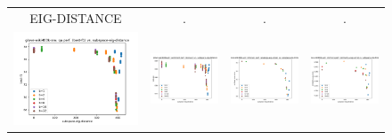 \begin{figure}
\begin{tabular}{@{\hskip -0.0in}c@{\hskip -0.0in}c@{\hskip -0.0in}c@{\hskip -0.0in}c@{\hskip -0.0in}}
		EIG-DISTANCE & . & . & . \\
		\includegraphics[width=.245\linewidth]{figures/glove-wiki400k-am_qa_best-f1_vs_subspace-eig-distance_linx.pdf} &
		\includegraphics[width=.245\linewidth]{figures/glove-wiki400k-am_sentiment_trec_test-acc_vs_subspace-eig-distance_linx.pdf} &
		\includegraphics[width=.245\linewidth]{figures/glove-wiki400k-am_intrinsics_analogy-avg-score_vs_subspace-eig-distance_linx.pdf} &
		\includegraphics[width=.245\linewidth]{figures/glove-wiki400k-am_intrinsics_similarity-avg-score_vs_subspace-eig-distance_linx.pdf} \\
		

\end{tabular}
\end{figure}
